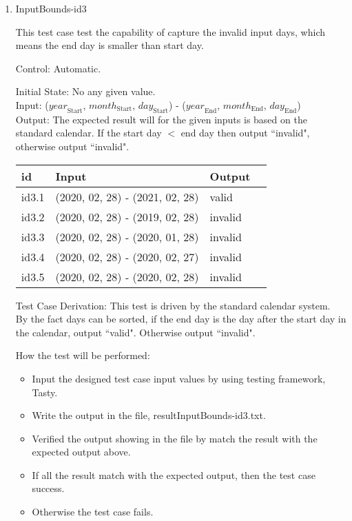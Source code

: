 \documentclass[12pt, titlepage]{article}
\begin{document}
\begin{enumerate}
\item{InputBounds-id3\\}

This test case test the capability of capture the invalid input days, which means the end day is smaller than start day.

Control: Automatic.
 
Initial State: No any given value.\\
Input: ($\mathit{year}_\text{Start}$, $\mathit{month}_\text{Start}$, $\mathit{day}_\text{Start}$) - ($\mathit{year}_\text{End}$, $\mathit{month}_\text{End}$, $\mathit{day}_\text{End}$)\\ 


Output: The expected result will for the given inputs is based on the standard calendar.
If the start day $<$ end day then output ``invalid", otherwise output ``invalid".

\noindent \begin{tabular}{l l l l} 
    \toprule		
    \textbf{id} & \textbf{Input} & \textbf{Output}\\ 
	\midrule
   id3.1 & (2020, 02, 28) - (2021, 02, 28) & valid\\
   id3.2 & (2020, 02, 28) - (2019, 02, 28)  & invalid\\
   id3.3 & (2020, 02, 28) - (2020, 01, 28)  & invalid\\
   id3.4 & (2020, 02, 28) - (2020, 02, 27)  & invalid\\
   id3.5 & (2020, 02, 28) - (2020, 02, 28)  & invalid\\
    \bottomrule
  \end{tabular}


Test Case Derivation: This test is driven by the standard calendar system.\\ By the fact days can be sorted, if the end day is the day after the start day in the  calendar, output ``valid". Otherwise output ``invalid".


How the test will be performed: 

\begin{itemize} 
\item Input the designed test case input values by using testing framework, Tasty. 
\item Write the output in the file, resultInputBounds-id3.txt.
\item Verified the output showing in the file by match the result with the expected output above.
\item If all the result match with the expected output, then the test case success.
\item Otherwise the test case fails.
\end{itemize}

\end{enumerate}
\end{document}
